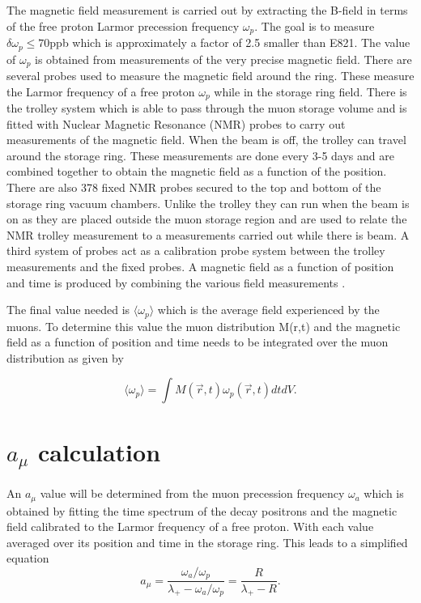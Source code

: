 The magnetic field measurement is carried out by extracting the B-field in terms of the free proton Larmor precession frequency $\omega{_p}$. The goal is to measure $\delta\omega_{p} \leq {70}$ppb which is approximately a factor of 2.5 smaller than E821. The value of $\omega_{p}$ is obtained from measurements of the very precise magnetic field. There are several probes used to measure the magnetic field around the ring. These measure the Larmor frequency of a free proton $\omega_{p}$ while in the storage ring field. There is the trolley system which is able to pass through the muon storage volume and is fitted with Nuclear Magnetic Resonance (NMR) probes to carry out measurements of the magnetic field. When the beam is off, the trolley can travel around the storage ring. These measurements are done every 3-5 days and are combined together to obtain the magnetic field as a function of the position.
There are also 378 fixed NMR probes secured to the top and bottom of the storage ring vacuum chambers. Unlike the trolley they can run when the beam is on as they are placed outside the muon storage region and are used to relate the NMR trolley measurement to a measurements carried out while there is beam. A third system of probes act as a calibration probe system between the trolley measurements and the fixed probes. A magnetic field as a function of position and time is produced by combining the various field measurements \cite{Chap2Ref1}.

The final value needed is $\big \langle \omega_{p} \big \rangle$ which is the average field experienced by the muons. To determine this value the muon distribution M(r,t) and the magnetic field as a function of position and time needs to be integrated over the muon distribution as given by

\begin{equation}
\big \langle {\omega_{p}} \big \rangle = \int M(\vec{r},t) {\omega_{p}}(\vec{r},t) dt dV. 
\end{equation}

\section{$a_{\mu}$ calculation}

An $a_{\mu}$ value will be determined from the muon precession frequency $\omega_{a}$ which is obtained by fitting the time spectrum of the decay positrons and the magnetic field calibrated to the Larmor frequency of a free proton. With each value averaged over its position and time in the storage ring.
\noindent
This leads to a simplified equation
\begin{equation}
a_{\mu} = \frac {\omega_{a}/\omega_{p}}{\lambda_{+}-\omega_{a}/\omega_{p}} = \frac {R}{\lambda_{+} -R}.
\end{equation}
 
